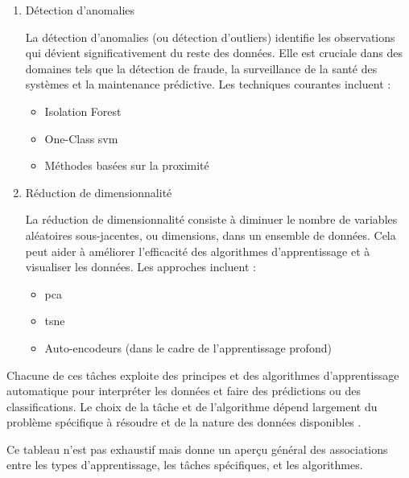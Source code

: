 \begin{enumerate}
    \item Détection d'anomalies
    
    La détection d'anomalies (ou détection d'outliers) identifie les observations qui dévient significativement du reste des données. Elle est cruciale dans des domaines tels que la détection de fraude, la surveillance de la santé des systèmes et la maintenance prédictive. Les techniques courantes incluent :

       \begin{itemize}
            \item Isolation Forest
            \item One-Class \acs{svm}
            \item Méthodes basées sur la proximité
       \end{itemize}

    \item Réduction de dimensionnalité
    
    La réduction de dimensionnalité consiste à diminuer le nombre de variables aléatoires sous-jacentes, ou dimensions, dans un ensemble de données. Cela peut aider à améliorer l'efficacité des algorithmes d'apprentissage et à visualiser les données. Les approches incluent :

        \begin{itemize}
            \item \ac{pca}
            \item \ac{tsne}
            \item Auto-encodeurs (dans le cadre de l'apprentissage profond)
        \end{itemize}
\end{enumerate}

Chacune de ces tâches exploite des principes et des algorithmes d'apprentissage automatique pour interpréter les données et faire des prédictions ou des classifications. Le choix de la tâche et de l'algorithme dépend largement du problème spécifique à résoudre et de la nature des données disponibles \cite{ml_task, Flach_2012}.

Ce tableau n'est pas exhaustif mais donne un aperçu général des associations entre les types d'apprentissage, les tâches spécifiques, et les algorithmes.

